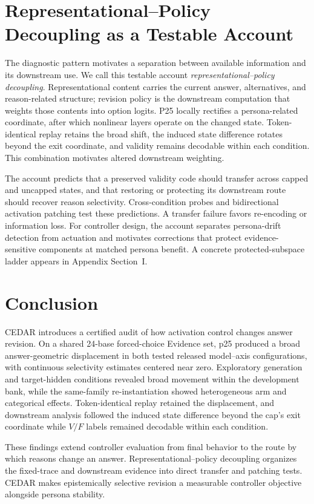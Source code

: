 \documentclass[letterpaper]{article} %
\begin{document}
\section{Representational--Policy Decoupling as a Testable Account}
\label{sec:implications}

The diagnostic pattern motivates a separation between available information and its downstream use. We call this testable account \emph{representational--policy decoupling}. Representational content carries the current answer, alternatives, and reason-related structure; revision policy is the downstream computation that weights those contents into option logits. P25 locally rectifies a persona-related coordinate, after which nonlinear layers operate on the changed state. Token-identical replay retains the broad shift, the induced state difference rotates beyond the exit coordinate, and validity remains decodable within each condition. This combination motivates altered downstream weighting.

The account predicts that a preserved validity code should transfer across capped and uncapped states, and that restoring or protecting its downstream route should recover reason selectivity. Cross-condition probes and bidirectional activation patching test these predictions. A transfer failure favors re-encoding or information loss. For controller design, the account separates persona-drift detection from actuation and motivates corrections that protect evidence-sensitive components at matched persona benefit. A concrete protected-subspace ladder appears in Appendix Section~I.

\section{Conclusion}
\label{sec:conclusion}

CEDAR introduces a certified audit of how activation control changes answer revision. On a shared 24-base forced-choice Evidence set, p25 produced a broad answer-geometric displacement in both tested released model--axis configurations, with continuous selectivity estimates centered near zero. Exploratory generation and target-hidden conditions revealed broad movement within the development bank, while the same-family re-instantiation showed heterogeneous arm and categorical effects. Token-identical replay retained the displacement, and downstream analysis followed the induced state difference beyond the cap's exit coordinate while $V/F$ labels remained decodable within each condition.

These findings extend controller evaluation from final behavior to the route by which reasons change an answer. Representational--policy decoupling organizes the fixed-trace and downstream evidence into direct transfer and patching tests. CEDAR makes epistemically selective revision a measurable controller objective alongside persona stability.


\end{document}
